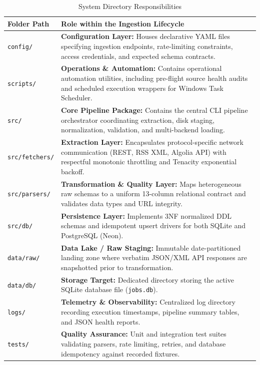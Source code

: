 \documentclass[10pt,letterpaper]{article}
\begin{document}
\begin{table}[htbp]
\centering
\small
\begin{tabularx}{\textwidth}{p{3.2cm}X}
\toprule
\textbf{Folder Path} & \textbf{Role within the Ingestion Lifecycle} \\
\midrule
\texttt{config/} & \textbf{Configuration Layer:} Houses declarative YAML files specifying ingestion endpoints, rate-limiting constraints, access credentials, and expected schema contracts. \\
\addlinespace
\texttt{scripts/} & \textbf{Operations \& Automation:} Contains operational automation utilities, including pre-flight source health audits and scheduled execution wrappers for Windows Task Scheduler. \\
\addlinespace
\texttt{src/} & \textbf{Core Pipeline Package:} Contains the central CLI pipeline orchestrator coordinating extraction, disk staging, normalization, validation, and multi-backend loading. \\
\addlinespace
\texttt{src/fetchers/} & \textbf{Extraction Layer:} Encapsulates protocol-specific network communication (REST, RSS XML, Algolia API) with respectful monotonic throttling and Tenacity exponential backoff. \\
\addlinespace
\texttt{src/parsers/} & \textbf{Transformation \& Quality Layer:} Maps heterogeneous raw schemas to a uniform 13-column relational contract and validates data types and URL integrity. \\
\addlinespace
\texttt{src/db/} & \textbf{Persistence Layer:} Implements 3NF normalized DDL schemas and idempotent upsert drivers for both SQLite and PostgreSQL (Neon). \\
\addlinespace
\texttt{data/raw/} & \textbf{Data Lake / Raw Staging:} Immutable date-partitioned landing zone where verbatim JSON/XML API responses are snapshotted prior to transformation. \\
\addlinespace
\texttt{data/db/} & \textbf{Storage Target:} Dedicated directory storing the active SQLite database file (\texttt{jobs.db}). \\
\addlinespace
\texttt{logs/} & \textbf{Telemetry \& Observability:} Centralized log directory recording execution timestamps, pipeline summary tables, and JSON health reports. \\
\addlinespace
\texttt{tests/} & \textbf{Quality Assurance:} Unit and integration test suites validating parsers, rate limiting, retries, and database idempotency against recorded fixtures. \\
\bottomrule
\end{tabularx}
\caption{System Directory Responsibilities}
\end{table}
\end{document}
